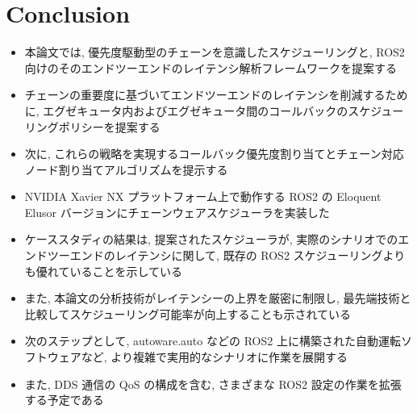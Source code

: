 
\section{Conclusion}
\label{sec: conslusion}

\begin{frame}{}
    \begin{itemize}
        \item 本論文では, 優先度駆動型のチェーンを意識したスケジューリングと, ROS2 向けのそのエンドツーエンドのレイテンシ解析フレームワークを提案する
\item チェーンの重要度に基づいてエンドツーエンドのレイテンシを削減するために, エグゼキュータ内およびエグゼキュータ間のコールバックのスケジューリングポリシーを提案する
\item 次に, これらの戦略を実現するコールバック優先度割り当てとチェーン対応ノード割り当てアルゴリズムを提示する
\item NVIDIA Xavier NX プラットフォーム上で動作する ROS2 の Eloquent Elusor バージョンにチェーンウェアスケジューラを実装した
\item ケーススタディの結果は, 提案されたスケジューラが, 実際のシナリオでのエンドツーエンドのレイテンシに関して, 既存の ROS2 スケジューリングよりも優れていることを示している
\item また, 本論文の分析技術がレイテンシーの上界を厳密に制限し, 最先端技術と比較してスケジューリング可能率が向上することも示されている
    \end{itemize}
\end{frame}

\begin{frame}{}
    \begin{itemize}
        \item 次のステップとして, autoware.auto などの ROS2 上に構築された自動運転ソフトウェアなど, より複雑で実用的なシナリオに作業を展開する
\item また, DDS 通信の QoS の構成を含む, さまざまな ROS2 設定の作業を拡張する予定である
    \end{itemize}
\end{frame}
